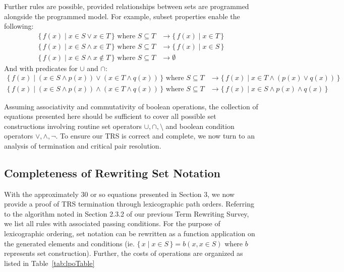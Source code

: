 \documentclass{article}
\newcommand{\Set}[2]{%
  \{\, #1 \mid #2 \, \}%
}
\begin{document}
Further rules are possible, provided relationships between sets are programmed alongside the programmed model. For example, subset properties enable the following:
\begin{align}
  \Set{f(x)}{x \in S \lor x \in T} \text{ where } S \subseteq T &\rightarrow \Set{f(x)}{x \in T}\\
  \Set{f(x)}{x \in S \land x \in T} \text{ where } S \subseteq T &\rightarrow \Set{f(x)}{x \in S}\\
  \Set{f(x)}{x \in S \land x \notin T} \text{ where } S \subseteq T &\rightarrow \emptyset
\end{align}
And with predicates for $\cup$ and $\cap$:
\begin{align}
  \Set{f(x)}{(x \in S \land p(x)) \lor (x \in T \land q(x))} \text{ where } S \subseteq T &\rightarrow \Set{f(x)}{x \in T \land (p(x) \lor q(x))}\\
  \Set{f(x)}{(x \in S \land p(x)) \land (x \in T \land q(x))} \text{ where } S \subseteq T &\rightarrow \Set{f(x)}{x \in S \land p(x) \land q(x)}
\end{align}

Assuming associativity and commutativity of boolean operations, the collection of equations presented here should be sufficient to cover all possible set constructions involving routine set operators $\cup, \cap, \setminus$ and boolean condition operators $\lor, \land, \lnot$. To ensure our TRS is correct and complete, we now turn to an analysis of termination and critical pair resolution.

\subsection{Completeness of Rewriting Set Notation}

With the approximately 30 or so equations presented in Section 3, we now provide a proof of TRS termination through lexicographic path orders. Referring to the algorithm noted in Section 2.3.2 of our previous Term Rewriting Survey, we list all rules with associated passing conditions. For the purpose of lexicographic ordering, set notation can be rewritten as a function application on the generated elements and conditions (ie. $\Set{x}{x \in S} = b(x, x\in S)$ where $b$ represents set construction). Further, the costs of operations are organized as listed in Table~\ref{tab:lpoTable}
\end{document}
